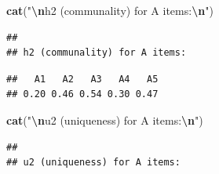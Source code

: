 \documentclass[
]{article}
\newenvironment{Shaded}{\begin{snugshade}}{\end{snugshade}}
\newcommand{\DecValTok}[1]{\textcolor[rgb]{0.00,0.00,0.81}{#1}}
\newcommand{\FunctionTok}[1]{\textcolor[rgb]{0.13,0.29,0.53}{\textbf{#1}}}
\newcommand{\NormalTok}[1]{#1}
\newcommand{\SpecialCharTok}[1]{\textcolor[rgb]{0.81,0.36,0.00}{\textbf{#1}}}
\newcommand{\StringTok}[1]{\textcolor[rgb]{0.31,0.60,0.02}{#1}}
\begin{document}
\begin{Shaded}
\begin{Highlighting}[]
\FunctionTok{cat}\NormalTok{(}\StringTok{"}\SpecialCharTok{\textbackslash{}n}\StringTok{h2 (communality) for A items:}\SpecialCharTok{\textbackslash{}n}\StringTok{"}\NormalTok{)}
\end{Highlighting}
\end{Shaded}

\begin{verbatim}
## 
## h2 (communality) for A items:
\end{verbatim}

\begin{Shaded}
\end{Shaded}

\begin{verbatim}
##   A1   A2   A3   A4   A5 
## 0.20 0.46 0.54 0.30 0.47
\end{verbatim}

\begin{Shaded}
\begin{Highlighting}[]
\FunctionTok{cat}\NormalTok{(}\StringTok{"}\SpecialCharTok{\textbackslash{}n}\StringTok{u2 (uniqueness) for A items:}\SpecialCharTok{\textbackslash{}n}\StringTok{"}\NormalTok{)}
\end{Highlighting}
\end{Shaded}

\begin{verbatim}
## 
## u2 (uniqueness) for A items:
\end{verbatim}

\begin{Shaded}
\end{Shaded}
\end{document}
